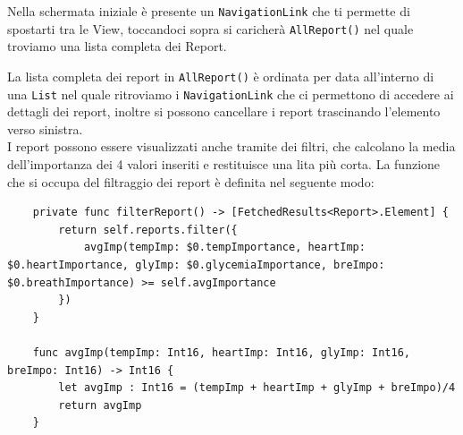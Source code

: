 \documentclass{article}
\begin{document}
Nella schermata iniziale è presente un \texttt{NavigationLink} che ti permette di spostarti tra le View, toccandoci sopra si caricherà \texttt{AllReport()} nel quale troviamo una lista completa dei Report.

\smallskip

La lista completa dei report in \texttt{AllReport()} è ordinata per data all'interno di una \texttt{List} nel quale ritroviamo i \texttt{NavigationLink} che ci permettono di accedere ai dettagli dei report, inoltre si possono cancellare i report trascinando l'elemento verso sinistra. \\
I report possono essere visualizzati anche tramite dei filtri, che calcolano la media dell'importanza dei 4 valori inseriti e restituisce una lita più corta. La funzione che si occupa del filtraggio dei report è definita nel seguente modo:

\smallskip
\begin{lstlisting}
    private func filterReport() -> [FetchedResults<Report>.Element] {
        return self.reports.filter({
            avgImp(tempImp: $0.tempImportance, heartImp: $0.heartImportance, glyImp: $0.glycemiaImportance, breImpo: $0.breathImportance) >= self.avgImportance
        })
    }
    
    func avgImp(tempImp: Int16, heartImp: Int16, glyImp: Int16, breImpo: Int16) -> Int16 {
        let avgImp : Int16 = (tempImp + heartImp + glyImp + breImpo)/4
        return avgImp
    }
\end{lstlisting}
\end{document}
